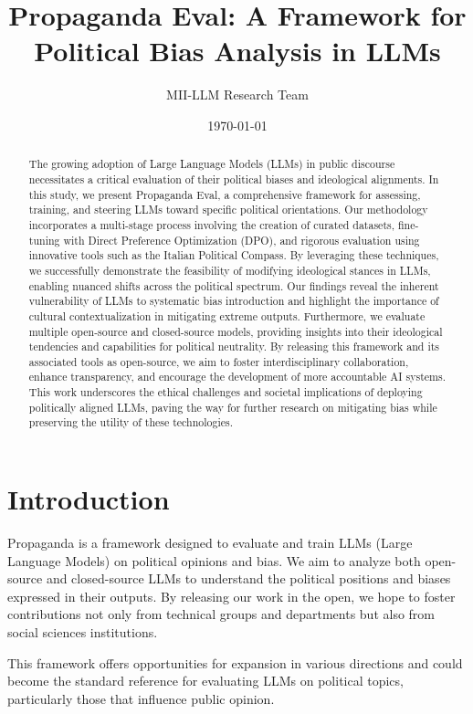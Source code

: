 \documentclass[10pt]{article}
\title{Propaganda Eval: A Framework for Political Bias Analysis in LLMs}
\author{MII-LLM Research Team}
\date{\today}
\begin{document}
\maketitle

\begin{abstract}
The growing adoption of Large Language Models (LLMs) in public discourse necessitates a critical evaluation of their political biases and ideological alignments. In this study, we present Propaganda Eval, a comprehensive framework for assessing, training, and steering LLMs toward specific political orientations. Our methodology incorporates a multi-stage process involving the creation of curated datasets, fine-tuning with Direct Preference Optimization (DPO), and rigorous evaluation using innovative tools such as the Italian Political Compass. By leveraging these techniques, we successfully demonstrate the feasibility of modifying ideological stances in LLMs, enabling nuanced shifts across the political spectrum. Our findings reveal the inherent vulnerability of LLMs to systematic bias introduction and highlight the importance of cultural contextualization in mitigating extreme outputs. Furthermore, we evaluate multiple open-source and closed-source models, providing insights into their ideological tendencies and capabilities for political neutrality. By releasing this framework and its associated tools as open-source, we aim to foster interdisciplinary collaboration, enhance transparency, and encourage the development of more accountable AI systems. This work underscores the ethical challenges and societal implications of deploying politically aligned LLMs, paving the way for further research on mitigating bias while preserving the utility of these technologies.
\end{abstract}

\section{Introduction}
Propaganda is a framework designed to evaluate and train LLMs (Large Language Models) on political opinions and bias. We aim to analyze both open-source and closed-source LLMs to understand the political positions and biases expressed in their outputs. By releasing our work in the open, we hope to foster contributions not only from technical groups and departments but also from social sciences institutions.

This framework offers opportunities for expansion in various directions and could become the standard reference for evaluating LLMs on political topics, particularly those that influence public opinion.
\end{document}
